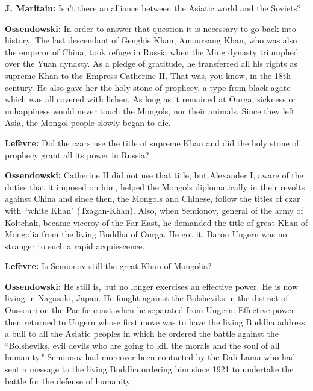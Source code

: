 \textbf{J. Maritain:} Isn't there an alliance between the Asiatic world and the Soviets?

\textbf{Ossendowski:} In order to answer that question it is necessary to go back into history. The last descendant of Genghis Khan, Amoursang Khan, who was also the emperor of China, took refuge in Russia when the Ming dynasty triumphed over the Yuan dynasty. As a pledge of gratitude, he transferred all his rights as supreme Khan to the Empress Catherine II. That was, you know, in the 18th century. He also gave her the holy stone of prophecy, a type from black agate which was all covered with lichen. As long as it remained at Ourga, sickness or unhappiness would never touch the Mongols, nor their animals. Since they left Asia, the Mongol people slowly began to die.

\textbf{Lefèvre:} Did the czars use the title of supreme Khan and did the holy stone of prophecy grant all its power in Russia?

\textbf{Ossendowski:} Catherine II did not use that title, but Alexander I, aware of the duties that it imposed on him, helped the Mongols diplomatically in their revolts against China and since then, the Mongols and Chinese, follow the titles of czar with ``white Khan" (Tzagan-Khan). Also, when Semionov, general of the army of Koltchak, became viceroy of the Far East, he demanded the title of great Khan of Mongolia from the living Buddha of Ourga. He got it. Baron Ungern was no stranger to such a rapid acquiescence.

\textbf{Lefèvre:} Is Semionov still the great Khan of Mongolia?

\textbf{Ossendowski:} He still is, but no longer exercises an effective power. He is now living in Nagasaki, Japan. He fought against the Bolsheviks in the district of Oussouri on the Pacific coast when he separated from Ungern. Effective power then returned to Ungern whose first move was to have the living Buddha address a bull to all the Asiatic peoples in which he ordered the battle against the ``Bolsheviks, evil devils who are going to kill the morals and the soul of all humanity." Semionov had moreover been contacted by the Dali Lama who had sent a message to the living Buddha ordering him since 1921 to undertake the battle for the defense of humanity.


